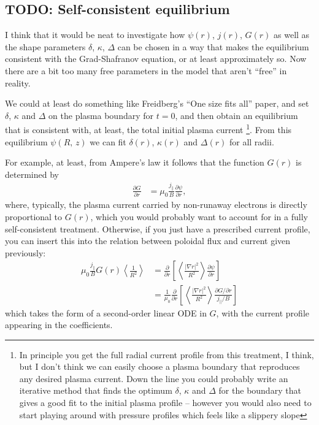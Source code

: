 \documentclass[11pt,a4paper]{article}
\newcommand{\rd}{\ensuremath{\mathrm{d}}}
\begin{document}
\subsection{TODO: Self-consistent equilibrium}
I think that it would be neat to investigate how $\psi(r)$, $j(r)$, $G(r)$ as well as the shape parameters $\delta$, $\kappa$, $\Delta$ can be chosen in a way that makes the equilibrium consistent with the Grad-Shafranov equation, or at least approximately so. Now there are a bit too many free parameters in the model that aren't ``free'' in reality. %

We could at least do something like Freidberg's ``One size fits all'' paper, and set $\delta$, $\kappa$ and $\Delta$ on the plasma boundary for $t=0$, and then obtain an equilibrium that is consistent with, at least, the total initial plasma current \footnote{In principle you get the full radial current profile from this treatment, I think, but I don't think we can easily choose a plasma boundary that reproduces any desired plasma current. Down the line you could probably write an iterative method that finds the optimum $\delta$, $\kappa$ and $\Delta$ for the boundary that gives a good fit to the initial plasma profile -- however you would also need to start playing around with pressure profiles which feels like a slippery slope}. From this equilibrium $\psi(R,\,z)$ we can fit $\delta(r)$, $\kappa(r)$ and $\Delta(r)$ for all radii.

For example, at least, from Ampere's law it follows that the function $G(r)$ is determined by
\begin{align}
\frac{\partial G}{\partial r} &= \mu_0\frac{j_\parallel}{B}\frac{\partial \psi}{\partial r},
\end{align}
where, typically, the plasma current carried by non-runaway electrons is directly proportional to $G(r)$, which you would probably want to account for in a fully self-consistent treatment. Otherwise, if you just have a prescribed current profile, you can insert this into the relation between poloidal flux and current given previously:
\begin{align}
\mu_0 \frac{j_\parallel}{B} G(r)\left\langle \frac{1}{R^2}\right\rangle &= \frac{\partial }{\partial r}\left[\left\langle \frac{|\nabla r|^2}{R^2}\right\rangle \frac{\partial \psi}{\partial r}\right] \nonumber \\
&=\frac{1}{\mu_0}\frac{\partial }{\partial r}\left[\left\langle \frac{|\nabla r|^2}{R^2}\right\rangle \frac{\partial G/\partial r}{j_\parallel/B}\right] 
\end{align}
which takes the form of a second-order linear ODE in $G$, with the current profile appearing in the coefficients.
\end{document}
